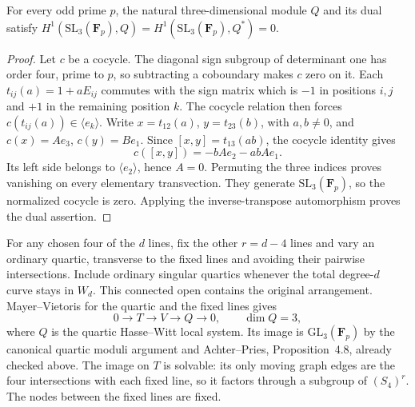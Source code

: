 \begin{lemma}\label{lem:sl3-natural-h1-odd}
For every odd prime $p$, the natural three-dimensional module $Q$
and its dual satisfy
$H^1(\mathrm{SL}_3(\mathbf F_p),Q)=
H^1(\mathrm{SL}_3(\mathbf F_p),Q^*)=0$.
\end{lemma}

\begin{proof}
Let $c$ be a cocycle.  The diagonal sign subgroup of determinant one
has order four, prime to $p$, so subtracting a coboundary makes $c$
zero on it.  Each $t_{ij}(a)=1+aE_{ij}$ commutes with the sign matrix
which is $-1$ in positions $i,j$ and $+1$ in the remaining position
$k$.  The cocycle relation then forces
$c(t_{ij}(a))\in\langle e_k\rangle$.
Write $x=t_{12}(a)$, $y=t_{23}(b)$, with $a,b\ne0$, and
$c(x)=Ae_3$, $c(y)=Be_1$.  Since $[x,y]=t_{13}(ab)$, the cocycle
identity gives
\[
 c([x,y])=-bA e_2-abA e_1.
\]
Its left side belongs to $\langle e_2\rangle$, hence $A=0$.
Permuting the three indices proves vanishing on every elementary
transvection.  They generate $\mathrm{SL}_3(\mathbf F_p)$, so the
normalized cocycle is zero.  Applying the inverse-transpose
automorphism proves the dual assertion.
\end{proof}

For any chosen four of the $d$ lines, fix the other $r=d-4$ lines and
vary an ordinary quartic, transverse to the fixed lines and avoiding
their pairwise intersections.  Include ordinary singular quartics
whenever the total degree-$d$ curve stays in $W_d$.  This connected
open contains the original arrangement.  Mayer--Vietoris for the
quartic and the fixed lines gives
\begin{equation}\label{eq:odd-quartic-boundary}
 0\longrightarrow T\longrightarrow V\longrightarrow Q
 \longrightarrow0,\qquad \dim Q=3,
\end{equation}
where $Q$ is the quartic Hasse--Witt local system.  Its image is
$\mathrm{GL}_3(\mathbf F_p)$ by the canonical quartic moduli argument
and Achter--Pries, Proposition~4.8, already checked above.  The image
on $T$ is solvable: its only moving graph edges are the four
intersections with each fixed line, so it factors through a subgroup
of $(S_4)^r$.  The nodes between the fixed lines are fixed.

